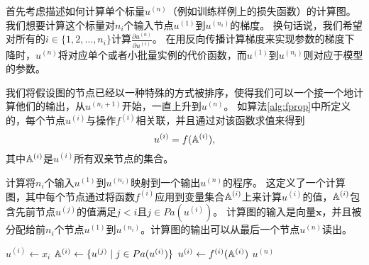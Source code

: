首先考虑描述如何计算单个标量$u^{(n)}$（例如训练样例上的损失函数）的计算图。
我们想要计算这个标量对$n_i$个输入节点$u^{(1)}$到$u^{(n_i)}$的梯度。
换句话说，我们希望对所有的$i\in\{1,2,\ldots,n_i\}$计算$\frac{\partial u^{(n)}}{\partial u^{(i)}}$。
在用反向传播计算梯度来实现参数的梯度下降时，$u^{(n)}$将对应单个或者小批量实例的代价函数，而$u^{(1)}$到$u^{(n_i)}$则对应于模型的参数。


我们将假设图的节点已经以一种特殊的方式被排序，使得我们可以一个接一个地计算他们的输出，从$u^{(n_i+1)}$开始，一直上升到$u^{(n)}$。
如算法\ref{alg:fprop}中所定义的，每个节点$u^{(i)}$与操作$f^{(i)}$相关联，并且通过对该函数求值来得到
\begin{equation}
  u^{(i)} = f(\mathbb{A}^{(i)}),
\end{equation}
其中$\mathbb{A}^{(i)}$是$u^{(i)}$所有双亲节点的集合。
\begin{algorithm}[htbp]
\caption{计算将$n_i$个输入$u^{(1)}$到$u^{(n_i)}$映射到一个输出$u^{(n)}$的程序。
这定义了一个计算图，其中每个节点通过将函数$f^{(i)}$应用到变量集合$\mathbb{A}^{(i)}$上来计算$u^{(i)}$的值，$\mathbb{A}^{(i)}$包含先前节点$u^{(j)}$的值满足$j<i$且$j \in Pa(u^{(i)})$。
计算图的输入是向量$\bm{x}$，并且被分配给前$n_i$个节点$u^{(1)}$到$u^{(n_i)}$。计算图的输出可以从最后一个节点$u^{(n)}$读出。}
\label{alg:fprop}
\begin{algorithmic}
 \STATE $u^{(i)} \leftarrow x_i$
\ENDFOR
{}
 \STATE $\mathbb{A}^{(i)} \leftarrow \{ u^{(j)} \mid j \in Pa(u^{(i)}) \}$
 \STATE $u^{(i)} \leftarrow f^{(i)}(\mathbb{A}^{(i)})$
\ENDFOR
{} $u^{(n)}$
\end{algorithmic}
\end{algorithm}


